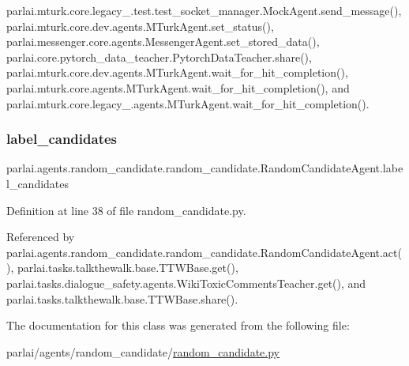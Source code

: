 parlai.\+mturk.\+core.\+legacy\+\_.\+test.\+test\+\_\+socket\+\_\+manager.\+Mock\+Agent.\+send\+\_\+message(), parlai.\+mturk.\+core.\+dev.\+agents.\+M\+Turk\+Agent.\+set\+\_\+status(), parlai.\+messenger.\+core.\+agents.\+Messenger\+Agent.\+set\+\_\+stored\+\_\+data(), parlai.\+core.\+pytorch\+\_\+data\+\_\+teacher.\+Pytorch\+Data\+Teacher.\+share(), parlai.\+mturk.\+core.\+dev.\+agents.\+M\+Turk\+Agent.\+wait\+\_\+for\+\_\+hit\+\_\+completion(), parlai.\+mturk.\+core.\+agents.\+M\+Turk\+Agent.\+wait\+\_\+for\+\_\+hit\+\_\+completion(), and parlai.\+mturk.\+core.\+legacy\+\_.\+agents.\+M\+Turk\+Agent.\+wait\+\_\+for\+\_\+hit\+\_\+completion().

\mbox{\label{classparlai_1_1agents_1_1random__candidate_1_1random__candidate_1_1RandomCandidateAgent_abd4570210c517ac8da9f269f8302f228}} 
\subsubsection{\texorpdfstring{label\+\_\+candidates}{label\_candidates}}
{\footnotesize\ttfamily parlai.\+agents.\+random\+\_\+candidate.\+random\+\_\+candidate.\+Random\+Candidate\+Agent.\+label\+\_\+candidates}



Definition at line 38 of file random\+\_\+candidate.\+py.



Referenced by parlai.\+agents.\+random\+\_\+candidate.\+random\+\_\+candidate.\+Random\+Candidate\+Agent.\+act(), parlai.\+tasks.\+talkthewalk.\+base.\+T\+T\+W\+Base.\+get(), parlai.\+tasks.\+dialogue\+\_\+safety.\+agents.\+Wiki\+Toxic\+Comments\+Teacher.\+get(), and parlai.\+tasks.\+talkthewalk.\+base.\+T\+T\+W\+Base.\+share().



The documentation for this class was generated from the following file\+:\begin{DoxyCompactItemize}
\item 
parlai/agents/random\+\_\+candidate/\hyperlink{random__candidate_8py}{random\+\_\+candidate.\+py}\end{DoxyCompactItemize}
